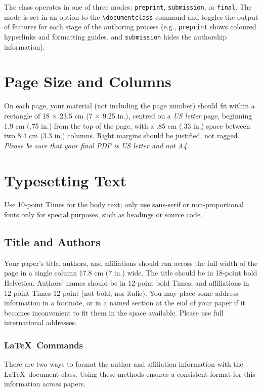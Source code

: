 \documentclass[preprint]{../latex/sigchi-modern}
\begin{document}
The class operates in one of three modes: \texttt{preprint},
\texttt{sub\-mis\-sion}, or \texttt{final}. The mode is set in an option to the
\texttt{\textbackslash documentclass} command and toggles the output of
features for each stage of the authoring process (e.g., \texttt{preprint} shows
coloured hyperlinks and formatting guides, and \texttt{submission} hides the
authorship information).

\section{Page Size and Columns}
On each page, your material (not including the page number) should fit within a
rectangle of 18 $\times$ 23.5 cm (7 $\times$ 9.25 in.), centred on a \textit{US
letter} page, beginning 1.9 cm (.75 in.) from the top of the page, with a .85 cm
(.33 in.) space between two 8.4 cm (3.3 in.) columns. Right margins should be
justified, not ragged. \textit{Please be sure that your final PDF is US letter
and not A4.}

\section{Typesetting Text}
Use 10-point Times for the body text; only use sans-serif or non-proportional
fonts only for special purposes, such as headings or source code.

\subsection{Title and Authors}
Your paper's title, authors, and affiliations should run across the full width of
the page in a single column 17.8 cm (7 in.) wide. The title should be in
18-point bold Helvetica. Authors' names should be in 12-point bold Times, and
affiliations in 12-point Times 12-point (not bold, nor italic).
You may place some address information in a footnote, or in a named section at
the end of your paper if it becomes inconvenient to fit them in the space
available. Please use full international addresses.

\subsubsection{\LaTeX\ Commands}
There are two ways to format the author and affiliation information  with the
\LaTeX\ document class. Using these methods ensures a consistent format for
this information across papers.
\end{document}
